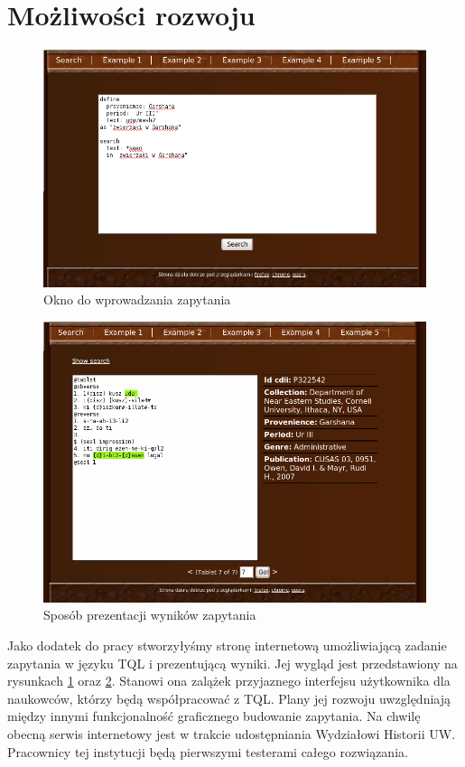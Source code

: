 \section*{Możliwości rozwoju}
\begin{figure}[h]
 \centering
 \includegraphics[width=450px]{../diagramy/wyszuk_zapyt.png}
 \caption{Okno do wprowadzania zapytania}
 \label{fig:wyszuk_zapyt}
\end{figure}

\begin{figure}[h]
 \centering
 \includegraphics[width=450px]{../diagramy/wyszuk_wynik.png}
 \caption{Sposób prezentacji wyników zapytania}
 \label{fig:wyszuk_wynik}
\end{figure}

Jako dodatek do pracy stworzyłyśmy stronę internetową umożliwiającą zadanie zapytania w języku TQL i prezentującą wyniki. 
Jej wygląd jest przedstawiony na rysunkach \ref{fig:wyszuk_zapyt} oraz \ref{fig:wyszuk_wynik}.
Stanowi ona zalążek przyjaznego interfejsu użytkownika dla naukowców, którzy będą współpracować z TQL. Plany jej rozwoju
uwzględniają między innymi funkcjonalność graficznego budowanie zapytania.
Na chwilę obecną serwis internetowy jest w trakcie udostępniania Wydziałowi Historii UW.
Pracownicy tej instytucji będą pierwszymi testerami całego rozwiązania.


